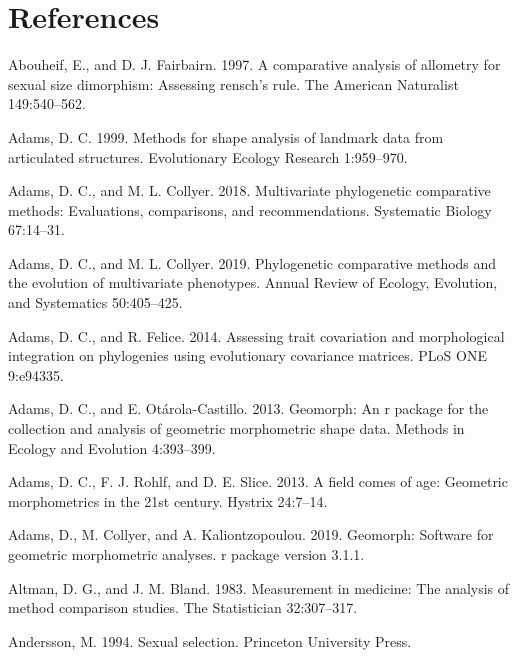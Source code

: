 \documentclass[]{article}
\begin{document}
\newpage

\section{References}\label{references}

\setlength{\parindent}{-0.25in} \setlength{\leftskip}{0.25in}
\setlength{\parskip}{8pt} \noindent

\hypertarget{refs}{}
\hypertarget{ref-Abouheif1997}{}
Abouheif, E., and D. J. Fairbairn. 1997. A comparative analysis of
allometry for sexual size dimorphism: Assessing rensch's rule. The
American Naturalist 149:540--562.

\hypertarget{ref-Adams1999}{}
Adams, D. C. 1999. Methods for shape analysis of landmark data from
articulated structures. Evolutionary Ecology Research 1:959--970.

\hypertarget{ref-AdamsCollyer2018a}{}
Adams, D. C., and M. L. Collyer. 2018. Multivariate phylogenetic
comparative methods: Evaluations, comparisons, and recommendations.
Systematic Biology 67:14--31.

\hypertarget{ref-AdamsCollyer2019}{}
Adams, D. C., and M. L. Collyer. 2019. Phylogenetic comparative methods
and the evolution of multivariate phenotypes. Annual Review of Ecology,
Evolution, and Systematics 50:405--425.

\hypertarget{ref-AdamsFelice2014}{}
Adams, D. C., and R. Felice. 2014. Assessing trait covariation and
morphological integration on phylogenies using evolutionary covariance
matrices. PLoS ONE 9:e94335.

\hypertarget{ref-AdamsOtarola2013}{}
Adams, D. C., and E. Otárola-Castillo. 2013. Geomorph: An r package for
the collection and analysis of geometric morphometric shape data.
Methods in Ecology and Evolution 4:393--399.

\hypertarget{ref-Adams_et_al2013}{}
Adams, D. C., F. J. Rohlf, and D. E. Slice. 2013. A field comes of age:
Geometric morphometrics in the 21st century. Hystrix 24:7--14.

\hypertarget{ref-AdamsGeomorph}{}
Adams, D., M. Collyer, and A. Kaliontzopoulou. 2019. Geomorph: Software
for geometric morphometric analyses. r package version 3.1.1.

\hypertarget{ref-Altman1983}{}
Altman, D. G., and J. M. Bland. 1983. Measurement in medicine: The
analysis of method comparison studies. The Statistician 32:307--317.

\hypertarget{ref-Andersson1994}{}
Andersson, M. 1994. Sexual selection. Princeton University Press.
\end{document}
